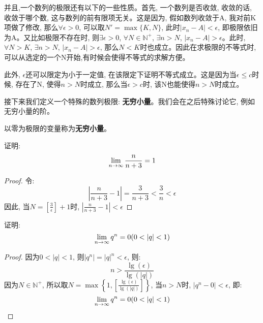 并且,一个数列的极限还有以下的一些性质。首先, 一个数列是否收敛, 收敛的话, 收敛于哪个数, 这与数列的前有限项无关。这是因为, 假如数列收敛于A, 我对前K项做了修改, 那么$\forall \epsilon > 0$, 可以取$N' = \max\{K, N\}$, 此时$\left| x_n -A \right| < \epsilon$, 即极限依旧为A。又比如极限不存在时, 则$\exists \epsilon > 0$, $\forall N \in \mathbb{N}^+$, $\exists n > N$, $\left| x_n - A \right| > \epsilon$。此时, $\forall N > K$, $\exists n > N$, $\left| x_n -A \right| > \epsilon$, 那么$N < K$时也成立。因此在求极限的不等式时, 可以从选定的一个N开始,有时候会使得不等式的求解方便。

此外, $\epsilon$还可以限定为小于一定值, 在该限定下证明不等式成立。这是因为当$\epsilon \le c$时候, 存在了N, 使得$n > N$时成立, 那么当$\epsilon > c$时, 该N也能使得$n >N$时成立。

接下来我们定义一个特殊的数列极限: {\bf 无穷小量}。我们会在之后特殊讨论它, 例如无穷小量的阶。 
\begin{definition}[无穷小量的定义]
    以零为极限的变量称为{\bf 无穷小量}。
\end{definition}

\begin{example}
    证明:
    \[ \lim_{n \to \infty } \frac{n}{n+3}= 1 \]
\end{example}
\begin{proof}
    令:
    \[ \left| \frac{n}{n+3} - 1 \right| = \frac{3}{n + 3} < \frac{3}{n} < \epsilon \]
    因此, 当$N = \left[ \frac{3}{\epsilon} \right] + 1$时, $\left| \frac{n}{n+3} - 1 \right| < \epsilon$
\end{proof}

\begin{example}
    证明:
    \[ \lim_{n \to \infty } q^n= 0(0 < \left|q\right| < 1) \]
\end{example}
\begin{proof}
    因为$0< \left|q\right| < 1$, 则$\left|q^n\right| = \left|q\right|^n < \epsilon$, 则:
    \[ n > \frac{\lg(\epsilon)}{\lg(\left|q\right|)} \]
    因为$N \in \mathbb{N}^+$, 所以取$N = \max\left\{1, \left[ \frac{\lg(\epsilon)}{\lg(\left|q\right|)} \right]\right\}$, 当$n > N$时, $\left| q^n - 0 \right| < \epsilon$, 即:
    \[ \lim_{n \to \infty } q^n = 0(0 < \left|q\right| < 1) \]
\end{proof}


